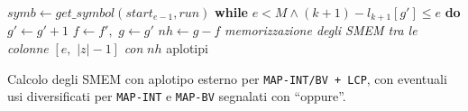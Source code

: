 \begin{algorithm}
\begin{algorithmic}[1]
    \State $symb\gets get\_symbol(start_{e-1}, run)$ 
    \EndWhile
    \EndIf
    \State \textbf{while} $e<M\land (k+1)-l_{k+1}[g']\leq e$ \textbf{do}
    $g'\gets g'+1$  
    \State $f\gets f',\,\,g\gets g'$
    \EndIf
    \EndIf
    \EndFor
    \State $nh\gets g-f$
    \State \textit{memorizzazione degli SMEM tra le colonne} $[e,\,\, |z|-1]$
    \textit{con} $nh$ aplotipi
    \EndIf
    \EndFunction
  \end{algorithmic}
  \caption{\footnotesize{Calcolo degli SMEM con aplotipo esterno per
  \texttt{MAP-INT/BV + LCP}, con eventuali usi diversificati per
  \texttt{MAP-INT} e \texttt{MAP-BV} segnalati con ``oppure''.}} 
  \label{algo:matchlcp}
\end{algorithm}


    
